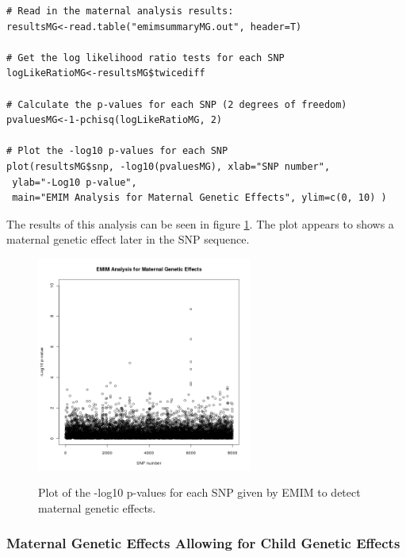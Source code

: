 \documentclass[a4paper,12pt]{article}
\begin{document}
\begin{enumerate}
\begin{lstlisting}
# Read in the maternal analysis results:
resultsMG<-read.table("emimsummaryMG.out", header=T)

# Get the log likelihood ratio tests for each SNP
logLikeRatioMG<-resultsMG$twicediff

# Calculate the p-values for each SNP (2 degrees of freedom)
pvaluesMG<-1-pchisq(logLikeRatioMG, 2)

# Plot the -log10 p-values for each SNP
plot(resultsMG$snp, -log10(pvaluesMG), xlab="SNP number",
 ylab="-Log10 p-value",
 main="EMIM Analysis for Maternal Genetic Effects", ylim=c(0, 10) )

\end{lstlisting} \vspace{0.35cm}The results of this analysis can be seen in figure  \ref{mateffs-fig}. The plot appears to shows a maternal genetic effect later in the SNP sequence.\end{enumerate}
{\begin{figure}[ht]
{\begin{center}
{\includegraphics[width=200pt]{plotMaternalEffects.png}}
\caption{Plot of the -log10 p-values for each SNP given by EMIM to detect maternal genetic effects.}
\label{mateffs-fig}
\end{center}}
\end{figure}
}


\subsubsection{Maternal Genetic Effects Allowing for Child Genetic Effects}
\label{eg-maternal-wo-child}
\end{document}
